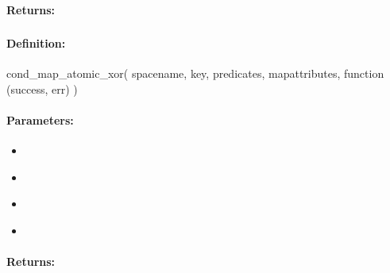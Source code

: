 \paragraph{Returns:}


\pagebreak
\subsubsection{}
\label{api:nodejs:cond_map_atomic_xor}


\paragraph{Definition:}
\begin{javascriptcode}
cond_map_atomic_xor(
        spacename, key, predicates, mapattributes, function (success, err) {})
\end{javascriptcode}
\paragraph{Parameters:}
\begin{itemize}[noitemsep]
\item {}\\

\item {}\\

\item {}\\

\item {}\\

\end{itemize}

\paragraph{Returns:}


\pagebreak
\subsubsection{}
\label{api:nodejs:group_map_atomic_xor}


